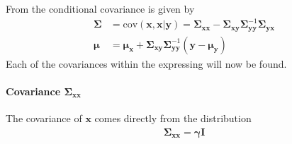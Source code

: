 From \cite{conditional_cov} the conditional covariance is given by
\begin{align*}
\boldsymbol{\Sigma} &= \text{cov}(\mathbf{x} , \mathbf{x} \vert \mathbf{y}) = \boldsymbol{\Sigma}_{\mathbf{xx}} - \boldsymbol{\Sigma}_{\mathbf{xy}} \boldsymbol{\Sigma}_{\mathbf{yy}}^{-1} \boldsymbol{\Sigma}_{\mathbf{yx}} \\
\boldsymbol{\mu} &= \boldsymbol{\mu}_{\mathbf{x}} + \boldsymbol{\Sigma}_{\mathbf{xy}} \boldsymbol{\Sigma}_{\mathbf{yy}}^{-1} (\mathbf{y} - \boldsymbol{\mu}_{\mathbf{y}})
\end{align*}
Each of the covariances within the expressing will now be found.

\paragraph{Covariance $\boldsymbol{\Sigma}_{\mathbf{xx}}$}
The covariance of $\mathbf{x}$ comes directly from the distribution  
\begin{align*}
\boldsymbol{\Sigma}_{\mathbf{xx}} = \boldsymbol{\gamma} \mathbf{I}
\end{align*} 

